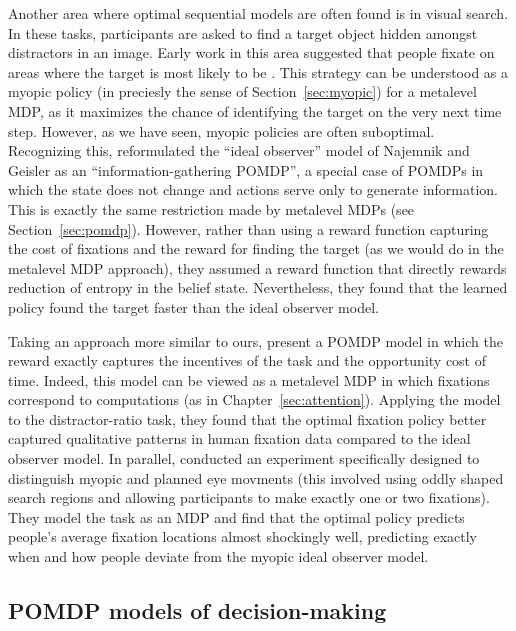 Another area where optimal sequential models are often found is in visual search. In these tasks, participants are asked to find a target object hidden amongst distractors in an image. Early work in this area suggested that people fixate on areas where the target is most likely to be \citep{najemnik2005optimal}. This strategy can be understood as a myopic policy (in preciesly the sense of Section~\ref{sec:myopic}) for a metalevel MDP, as it maximizes the chance of identifying the target on the very next time step. However, as we have seen, myopic policies are often suboptimal. Recognizing this, \citet{butko2008ipomdp} reformulated the ``ideal observer'' model of Najemnik and Geisler as an ``information-gathering POMDP'', a special case of POMDPs in which the state does not change and actions serve only to generate information. This is exactly the same restriction made by metalevel MDPs (see Section~\ref{sec:pomdp}). However, rather than using a reward function capturing the cost of fixations and the reward for finding the target (as we would do in the metalevel MDP approach), they assumed a reward function that directly rewards reduction of entropy in the belief state. Nevertheless, they found that the learned policy found the target faster than the ideal observer model.

Taking an approach more similar to ours, \citet{acharya2017human} present a POMDP model in which the reward exactly captures the incentives of the task and the opportunity cost of time. Indeed, this model can be viewed as a metalevel MDP in which fixations correspond to computations (as in Chapter~\ref{sec:attention}). Applying the model to the distractor-ratio task, they found that the optimal fixation policy better captured qualitative patterns in human fixation data compared to the ideal observer model. In parallel, \citet{hoppe2019multistep} conducted an experiment specifically designed to distinguish myopic and planned eye movments (this involved using oddly shaped search regions and allowing participants to make exactly one or two fixations). They model the task as an MDP and find that the optimal policy predicts people's average fixation locations almost shockingly well, predicting exactly when and how people deviate from the myopic ideal observer model.

\subsection{POMDP models of decision-making}\label{sec:alternative-pomdp}

